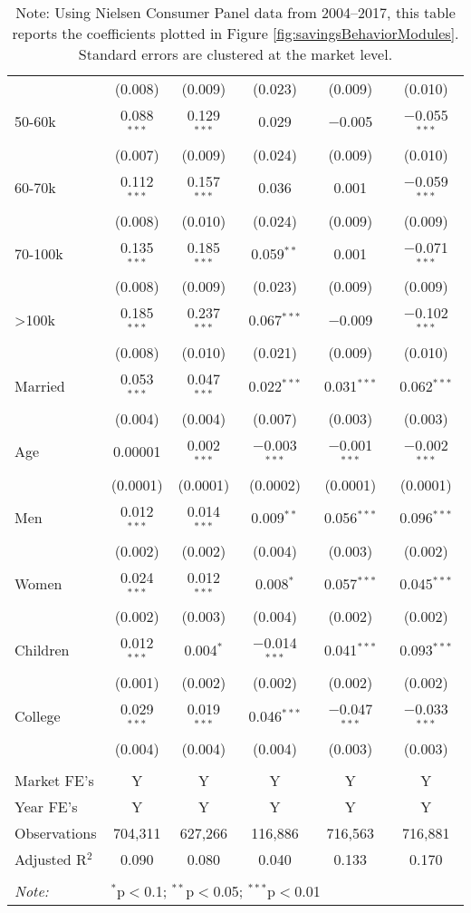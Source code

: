 \begin{table}[!htbp]
{\begin{tabular}{@{\extracolsep{5pt}}lccccc}
  & (0.008) & (0.009) & (0.023) & (0.009) & (0.010) \\
  50-60k & 0.088$^{***}$ & 0.129$^{***}$ & 0.029 & $-$0.005 & $-$0.055$^{***}$ \\
  & (0.007) & (0.009) & (0.024) & (0.009) & (0.010) \\
  60-70k & 0.112$^{***}$ & 0.157$^{***}$ & 0.036 & 0.001 & $-$0.059$^{***}$ \\
  & (0.008) & (0.010) & (0.024) & (0.009) & (0.009) \\
  70-100k & 0.135$^{***}$ & 0.185$^{***}$ & 0.059$^{**}$ & 0.001 & $-$0.071$^{***}$ \\
  & (0.008) & (0.009) & (0.023) & (0.009) & (0.009) \\
  >100k & 0.185$^{***}$ & 0.237$^{***}$ & 0.067$^{***}$ & $-$0.009 & $-$0.102$^{***}$ \\
  & (0.008) & (0.010) & (0.021) & (0.009) & (0.010) \\
  Married & 0.053$^{***}$ & 0.047$^{***}$ & 0.022$^{***}$ & 0.031$^{***}$ & 0.062$^{***}$ \\
  & (0.004) & (0.004) & (0.007) & (0.003) & (0.003) \\
  Age & 0.00001 & 0.002$^{***}$ & $-$0.003$^{***}$ & $-$0.001$^{***}$ & $-$0.002$^{***}$ \\
  & (0.0001) & (0.0001) & (0.0002) & (0.0001) & (0.0001) \\
  Men & 0.012$^{***}$ & 0.014$^{***}$ & 0.009$^{**}$ & 0.056$^{***}$ & 0.096$^{***}$ \\
  & (0.002) & (0.002) & (0.004) & (0.003) & (0.002) \\
  Women & 0.024$^{***}$ & 0.012$^{***}$ & 0.008$^{*}$ & 0.057$^{***}$ & 0.045$^{***}$ \\
  & (0.002) & (0.003) & (0.004) & (0.002) & (0.002) \\
  Children & 0.012$^{***}$ & 0.004$^{*}$ & $-$0.014$^{***}$ & 0.041$^{***}$ & 0.093$^{***}$ \\
  & (0.001) & (0.002) & (0.002) & (0.002) & (0.002) \\
  College & 0.029$^{***}$ & 0.019$^{***}$ & 0.046$^{***}$ & $-$0.047$^{***}$ & $-$0.033$^{***}$ \\
  & (0.004) & (0.004) & (0.004) & (0.003) & (0.003) \\
 \hline \\[-1.8ex]
Market FE's & Y & Y & Y & Y & Y \\
Year FE's & Y & Y & Y & Y & Y \\
Observations & 704,311 & 627,266 & 116,886 & 716,563 & 716,881 \\
Adjusted R$^{2}$ & 0.090 & 0.080 & 0.040 & 0.133 & 0.170 \\
\hline
\hline \\[-1.8ex]
\textit{Note:}  & \multicolumn{5}{l}{$^{*}$p$<$0.1; $^{**}$p$<$0.05; $^{***}$p$<$0.01} \\
\end{tabular}
}
\caption*{Note: Using Nielsen Consumer Panel data from 2004--2017, this table reports the coefficients plotted in Figure \ref{fig:savingsBehaviorModules}. Standard errors are clustered at the market level.}
\end{table}

